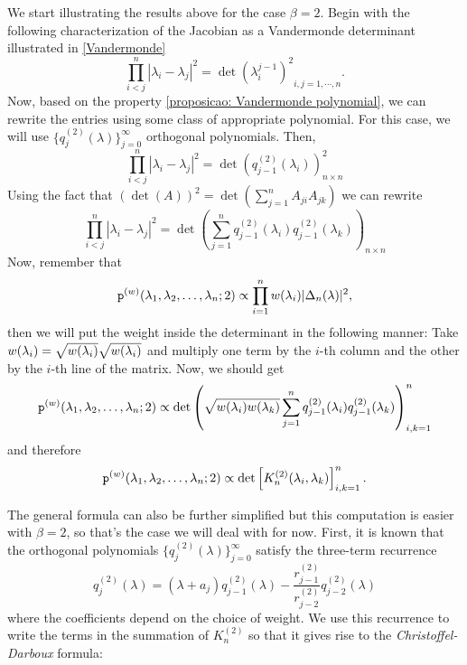 We start illustrating the results above for the case $\beta=2$. Begin with the following characterization of the Jacobian as a Vandermonde determinant illustrated in \ref{Vandermonde}
\begin{equation}
	\prod_{i<j}^{n} |\lambda_i - \lambda_j|^2 = {\det(\lambda_i^{j-1})^2}_{i,j=1,\cdots,n}.
\end{equation}
Now, based on the property \ref{proposicao: Vandermonde polynomial}, we can rewrite the entries using some class of appropriate polynomial. For this case, we will use $\{q_j^{(2)}(\lambda)\}_{j=0}^\infty$ orthogonal polynomials. Then,
\begin{equation}
	\prod_{i<j}^{n} |\lambda_i - \lambda_j|^2 = {\det\left(q_{j-1}^{(2)}(\lambda_i)\right)}^2_{n\times n}
\end{equation}
Using the fact that $(\det(A))^2 = \det(\sum_{j=1}^{n} A_{ji} A_{jk})$ we can rewrite
\begin{equation}
	\prod_{i<j}^{n} |\lambda_i - \lambda_j|^2 = {\det\left(\sum_{j=1}^{n} q_{j-1}^{(2)}(\lambda_i) q_{j-1}^{(2)}(\lambda_k) \right)}_{n\times n}
\end{equation}
Now, remember that
\begin{equation}
	\mathtt{p}^{(w)}(\lambda_1, \lambda_2, \dots, \lambda_n;2) \propto \prod_{i=1}^{n} w(\lambda_i) |\Delta_n(\lambda)|^2,
\end{equation}
then we will put the weight inside the determinant in the following manner: Take $w(\lambda_i) = \sqrt{w(\lambda_i)}\sqrt{w(\lambda_i)}$ and multiply one term by the $i$-th column and the other by the $i$-th line of the matrix. Now, we should get
\begin{equation}
	\mathtt{p}^{(w)}(\lambda_1, \lambda_2, \dots, \lambda_n;2) \propto {\det\left(\sqrt{w(\lambda_i)w(\lambda_k)} \sum_{j=1}^{n} q_{j-1}^{(2)}(\lambda_i) q_{j-1}^{(2)}(\lambda_k) \right)}_{i,k=1}^{n}
\end{equation}
and therefore
\begin{equation}
	\mathtt{p}^{(w)}(\lambda_1, \lambda_2, \dots, \lambda_n;2) \propto \det\left[ K_n^{(2)}(\lambda_i, \lambda_k) \right]_{i,k=1}^{n}.
\end{equation}

The general formula can also be further simplified but this computation is easier with $\beta = 2$, so that's the case we will deal with for now. First, it is known that the orthogonal polynomials $\{q_j^{(2)}(\lambda)\}_{j=0}^\infty$ satisfy the three-term recurrence
\begin{equation}
	q_{j}^{(2)}(\lambda) = (\lambda + a_j) q_{j-1}^{(2)}(\lambda) - \frac{r_{j-1}^{(2)}}{r_{j-2}^{(2)}} q_{j-2}^{(2)}(\lambda)
\end{equation} 
where the coefficients depend on the choice of weight. We use this recurrence to write the terms in the summation of $K_n^{(2)}$ so that it gives rise to the \textit{Christoffel-Darboux} formula:

